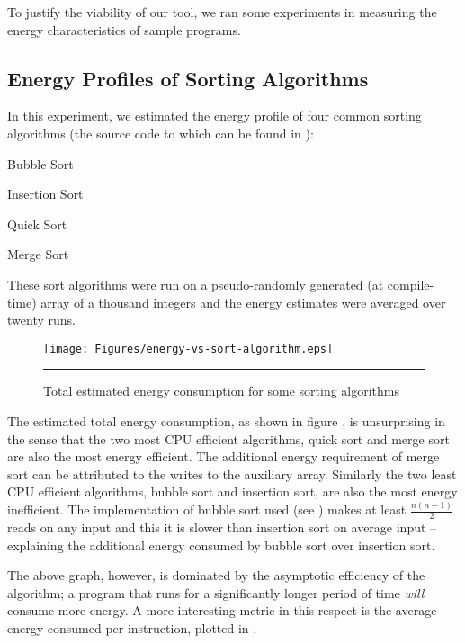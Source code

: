 To justify the viability of our tool, we ran some experiments in
measuring the energy characteristics of sample programs.

\subsection{Energy Profiles of Sorting Algorithms}

In this experiment, we estimated the energy profile of four common
sorting algorithms (the source code to which can be found in
):

\begin{itemize*}
\item Bubble Sort
\item Insertion Sort
\item Quick Sort
\item Merge Sort
\end{itemize*}

These sort algorithms were run on a pseudo-randomly generated (at
compile-time) array of a thousand integers and the energy estimates
were averaged over twenty runs.

\begin{figure}[htbp]
  \centering
  \texttt{[image: Figures/energy-vs-sort-algorithm.eps]}
  \rule{35em}{0.5pt}
  \caption{Total estimated energy consumption for some sorting algorithms}
  \label{fig:total-energy-sort-algo}
\end{figure}

The estimated total energy consumption, as shown in figure
, is unsurprising in the sense that
the two most CPU efficient algorithms, quick sort and merge sort are
also the most energy efficient.  The additional energy requirement of
merge sort can be attributed to the writes to the auxiliary array.
Similarly the two least CPU efficient algorithms, bubble sort and
insertion sort, are also the most energy inefficient.  The
implementation of bubble sort used (see
) makes at least $\frac{n (n - 1)}{2}$
reads on any input and this it is slower than insertion sort on
average input -- explaining the additional energy consumed by bubble
sort over insertion sort.

The above graph, however, is dominated by the asymptotic efficiency of
the algorithm; a program that runs for a significantly longer period
of time \textit{will} consume more energy.  A more interesting metric
in this respect is the average energy consumed per instruction,
plotted in .

